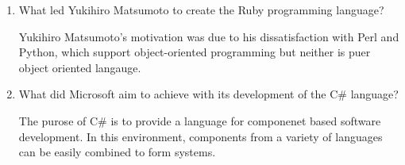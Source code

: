 \begin{enumerate}
\begin{answer}
    \end{answer}

  \item What led Yukihiro Matsumoto to create the Ruby programming language?

  \begin{answer}

    Yukihiro Matsumoto's motivation was due to his dissatisfaction with Perl and Python, which support object-oriented programming but neither is puer object oriented langauge.

    \end{answer}

  \item What did Microsoft aim to achieve with its development of the
    C\# language?

  \begin{answer}

    The purose of C\# is to provide a language for componenet based software development. In this environment, components from a variety of languages can be easily combined to form systems. 

    \end{answer}

  \end{enumerate}



